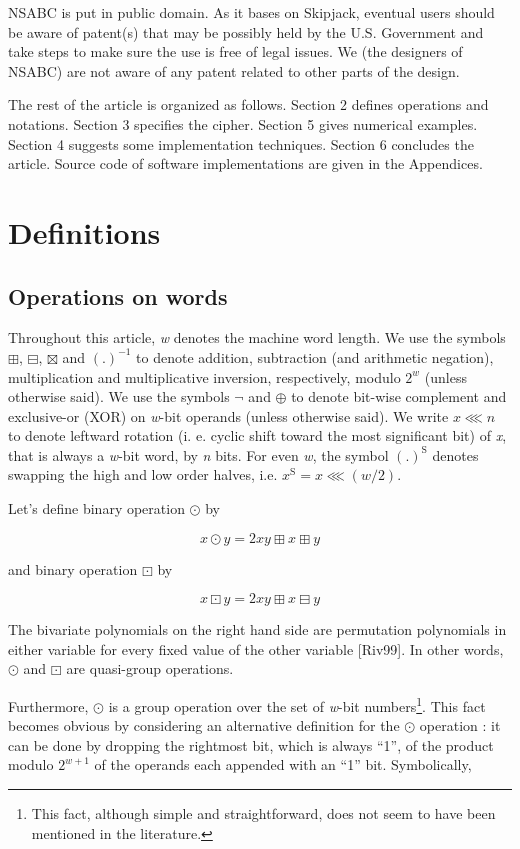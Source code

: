 \documentclass[a4paper,oneside,english]{amsart}
\numberwithin{equation}{section}
\numberwithin{figure}{section}
\begin{document}
NSABC is put in public domain. As it bases on Skipjack, eventual users
should be aware of patent(s) that may be possibly held by the U.S.
Government and take steps to make sure the use is free of legal issues.
We (the designers of NSABC) are not aware of any patent related to
other parts of the design.

The rest of the article is organized as follows. Section 2 defines
operations and notations. Section 3 specifies the cipher. Section
5 gives numerical examples. Section 4 suggests some implementation
techniques. Section 6 concludes the article. Source code of software
implementations are given in the Appendices.


\section{Definitions}


\subsection{Operations on words}

Throughout this article, \emph{w} denotes the machine word length.
We use the symbols $\boxplus$, $\boxminus$, $\boxtimes$ and $(.)^{-1}$
to denote addition, subtraction (and arithmetic negation), multiplication
and multiplicative inversion, respectively, modulo $2^{w}$ (unless
otherwise said). We use the symbols $\neg$ and $\oplus$ to denote
bit-wise complement and exclusive-or (XOR)\emph{ }on \emph{w}-bit
operands (unless otherwise said). We write $x\lll n$ to denote leftward
rotation (i. e. cyclic shift toward the most significant bit) of \emph{x},
that is always a \emph{w}-bit word, by \emph{n} bits. For even \emph{w},
the symbol $(.)^{\mathrm{S}}$ denotes swapping the high and low order
halves, i.e. $x{}^{\mathrm{S}}=x\lll(w/2).$

Let's define binary operation $\odot$ by

\[
x\odot y=2xy\boxplus x\boxplus y
\]


and binary operation $\boxdot$ by

\[
x\boxdot y=2xy\boxplus x\boxminus y
\]


The bivariate polynomials on the right hand side are permutation polynomials
in either variable for every fixed value of the other variable {[}Riv99{]}.
In other words, $\odot$ and $\boxdot$ are quasi-group operations.

Furthermore, $\odot$ is a group operation over the set of \emph{w}-bit
numbers\footnote{This fact, although simple and straightforward, does not seem to have
been mentioned in the literature.}. This fact becomes obvious by considering an alternative definition
for the $\odot$ operation \cite{Mey97}: it can be done by dropping
the rightmost bit, which is always {}``1'', of the product modulo
$2^{w+1}$ of the operands each appended with an {}``1'' bit. Symbolically,
\end{document}
